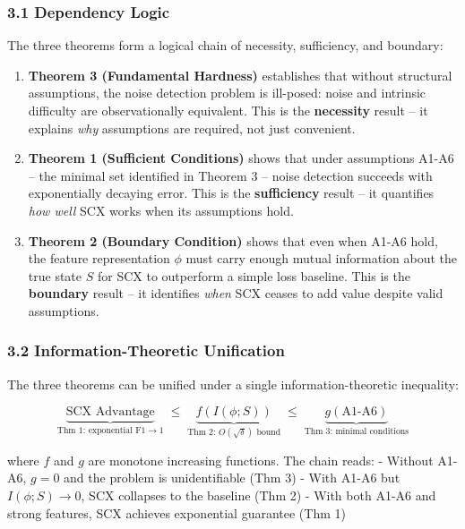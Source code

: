 \documentclass[
  12pt,
]{ctexart}
\begin{document}
\subsubsection{3.1 Dependency Logic}\label{dependency-logic}

The three theorems form a logical chain of necessity, sufficiency, and
boundary:

\begin{enumerate}
\def\labelenumi{\arabic{enumi}.}
\item
  \textbf{Theorem 3 (Fundamental Hardness)} establishes that without
  structural assumptions, the noise detection problem is ill-posed:
  noise and intrinsic difficulty are observationally equivalent. This is
  the \textbf{necessity} result -- it explains \emph{why} assumptions
  are required, not just convenient.
\item
  \textbf{Theorem 1 (Sufficient Conditions)} shows that under
  assumptions A1-A6 -- the minimal set identified in Theorem 3 -- noise
  detection succeeds with exponentially decaying error. This is the
  \textbf{sufficiency} result -- it quantifies \emph{how well} SCX works
  when its assumptions hold.
\item
  \textbf{Theorem 2 (Boundary Condition)} shows that even when A1-A6
  hold, the feature representation \(\phi\) must carry enough mutual
  information about the true state \(S\) for SCX to outperform a simple
  loss baseline. This is the \textbf{boundary} result -- it identifies
  \emph{when} SCX ceases to add value despite valid assumptions.
\end{enumerate}

\subsubsection{3.2 Information-Theoretic
Unification}\label{information-theoretic-unification}

The three theorems can be unified under a single information-theoretic
inequality:

\[\underbrace{\text{SCX Advantage}}_{\text{Thm 1: exponential F1} \to 1} \;\leq\; \underbrace{f(I(\phi; S))}_{\text{Thm 2: } O(\sqrt{\delta}) \text{ bound}} \;\leq\; \underbrace{g(\text{A1-A6})}_{\text{Thm 3: minimal conditions}}\]

where \(f\) and \(g\) are monotone increasing functions. The chain
reads: - Without A1-A6, \(g = 0\) and the problem is unidentifiable (Thm
3) - With A1-A6 but \(I(\phi; S) \to 0\), SCX collapses to the baseline
(Thm 2) - With both A1-A6 and strong features, SCX achieves exponential
guarantee (Thm 1)
\end{document}
